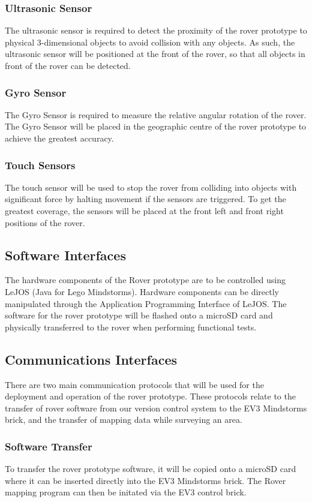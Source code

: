 \documentclass{article}
\begin{document}
\subsubsection{Ultrasonic Sensor}
The ultrasonic sensor is required to detect the proximity of the rover prototype to physical 3-dimensional objects to avoid collision with any objects. As such, the ultrasonic sensor will be positioned at the front of the rover, so that all objects in front of the rover can be detected.
\subsubsection{Gyro Sensor}
The Gyro Sensor is required to measure the relative angular rotation of the rover. The Gyro Sensor will be placed in the geographic centre of the rover prototype to achieve the greatest accuracy.
\subsubsection{Touch Sensors}
The touch sensor will be used to stop the rover from colliding into objects with significant force by halting movement if the sensors are triggered. To get the greatest coverage, the sensors will be placed at the front left and front right positions of the rover.
\subsection{Software Interfaces}
The hardware components of the Rover prototype are to be controlled using LeJOS (Java for Lego Mindstorms). Hardware components can be directly manipulated through the Application Programming Interface of LeJOS. The software for the rover prototype will be flashed onto a microSD card and physically transferred to the rover when performing functional tests.

\subsection{Communications Interfaces}
There are two main communication protocols that will be used for the deployment and operation of the rover prototype. These protocols relate to the transfer of rover software from our version control system to the EV3 Mindstorms brick, and the transfer of mapping data while surveying an area.
\subsubsection{Software Transfer}
To transfer the rover prototype software, it will be copied onto a microSD card where it can be inserted directly into the EV3 Mindstorms brick. The Rover mapping program can then be initated via the EV3 control brick.
\end{document}
